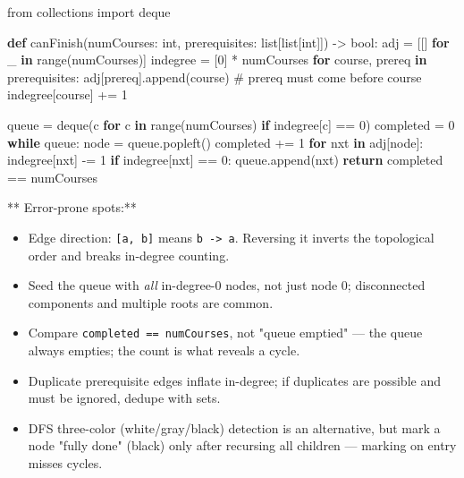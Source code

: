 \documentclass[11pt]{article}
\providecommand{\tightlist}{\setlength{\itemsep}{1pt}\setlength{\parskip}{0pt}}
\newenvironment{Shaded}{\begin{snugshade}}{\end{snugshade}}
\newcommand{\BuiltInTok}[1]{\textcolor[rgb]{0.50,0.55,0.55}{#1}}
\newcommand{\CommentTok}[1]{\textcolor[rgb]{0.48,0.49,0.49}{#1}}
\newcommand{\ControlFlowTok}[1]{\textcolor[rgb]{0.99,0.74,0.29}{\textbf{#1}}}
\newcommand{\DecValTok}[1]{\textcolor[rgb]{0.96,0.45,0.00}{#1}}
\newcommand{\ImportTok}[1]{\textcolor[rgb]{0.15,0.68,0.38}{#1}}
\newcommand{\KeywordTok}[1]{\textcolor[rgb]{0.81,0.81,0.76}{\textbf{#1}}}
\newcommand{\NormalTok}[1]{\textcolor[rgb]{0.81,0.81,0.76}{#1}}
\newcommand{\OperatorTok}[1]{\textcolor[rgb]{0.81,0.81,0.76}{#1}}
\begin{document}

\begin{Shaded}
\begin{Highlighting}[]
\ImportTok{from}\NormalTok{ collections }\ImportTok{import}\NormalTok{ deque}

\KeywordTok{def}\NormalTok{ canFinish(numCourses: }\BuiltInTok{int}\NormalTok{, prerequisites: }\BuiltInTok{list}\NormalTok{[}\BuiltInTok{list}\NormalTok{[}\BuiltInTok{int}\NormalTok{]]) }\OperatorTok{{-}\textgreater{}} \BuiltInTok{bool}\NormalTok{:}
\NormalTok{    adj }\OperatorTok{=}\NormalTok{ [[] }\ControlFlowTok{for}\NormalTok{ \_ }\KeywordTok{in} \BuiltInTok{range}\NormalTok{(numCourses)]}
\NormalTok{    indegree }\OperatorTok{=}\NormalTok{ [}\DecValTok{0}\NormalTok{] }\OperatorTok{*}\NormalTok{ numCourses}
    \ControlFlowTok{for}\NormalTok{ course, prereq }\KeywordTok{in}\NormalTok{ prerequisites:}
\NormalTok{        adj[prereq].append(course)  }\CommentTok{\# prereq must come before course}
\NormalTok{        indegree[course] }\OperatorTok{+=} \DecValTok{1}

\NormalTok{    queue }\OperatorTok{=}\NormalTok{ deque(c }\ControlFlowTok{for}\NormalTok{ c }\KeywordTok{in} \BuiltInTok{range}\NormalTok{(numCourses) }\ControlFlowTok{if}\NormalTok{ indegree[c] }\OperatorTok{==} \DecValTok{0}\NormalTok{)}
\NormalTok{    completed }\OperatorTok{=} \DecValTok{0}
    \ControlFlowTok{while}\NormalTok{ queue:}
\NormalTok{        node }\OperatorTok{=}\NormalTok{ queue.popleft()}
\NormalTok{        completed }\OperatorTok{+=} \DecValTok{1}
        \ControlFlowTok{for}\NormalTok{ nxt }\KeywordTok{in}\NormalTok{ adj[node]:}
\NormalTok{            indegree[nxt] }\OperatorTok{{-}=} \DecValTok{1}
            \ControlFlowTok{if}\NormalTok{ indegree[nxt] }\OperatorTok{==} \DecValTok{0}\NormalTok{:}
\NormalTok{                queue.append(nxt)}
    \ControlFlowTok{return}\NormalTok{ completed }\OperatorTok{==}\NormalTok{ numCourses}
\end{Highlighting}
\end{Shaded}

** Error-prone spots:**

\begin{itemize}
\tightlist
\item
  Edge direction: \texttt{{[}a,\ b{]}} means \texttt{b\ -\textgreater{}\ a}. Reversing it inverts the topological order and breaks in-degree counting.
\item
  Seed the queue with \emph{all} in-degree-0 nodes, not just node 0; disconnected components and multiple roots are common.
\item
  Compare \texttt{completed\ ==\ numCourses}, not "queue emptied" --- the queue always empties; the count is what reveals a cycle.
\item
  Duplicate prerequisite edges inflate in-degree; if duplicates are possible and must be ignored, dedupe with sets.
\item
  DFS three-color (white/gray/black) detection is an alternative, but mark a node "fully done" (black) only after recursing all children --- marking on entry misses cycles.
\end{itemize}
\end{document}
